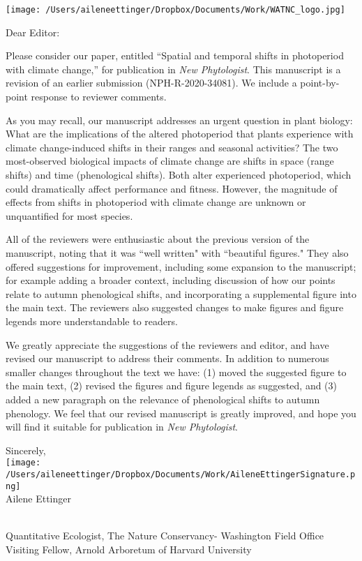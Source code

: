 \documentclass[11pt,a4paper]{letter}
\begin{document}
\begin{letter}{}
\texttt{[image: /Users/aileneettinger/Dropbox/Documents/Work/WATNC\_logo.jpg]}

\opening{Dear Editor:}
Please consider our paper, entitled ``Spatial and temporal shifts in photoperiod with climate change,'' for publication in  \emph{New Phytologist}. This manuscript is a revision of an earlier submission (NPH-R-2020-34081). We include a point-by-point response to reviewer comments.

\par As you may recall, our manuscript addresses an urgent question in plant biology: What are the implications
of the altered photoperiod that plants experience with climate change-induced shifts in their ranges and seasonal activities? The two most-observed biological impacts of climate change are shifts in space (range shifts) and time (phenological shifts). Both alter experienced photoperiod, which could dramatically affect performance and fitness. However, the magnitude of effects from shifts in photoperiod with climate change are unknown or unquantified for most species. 

\par All of the reviewers were enthusiastic about the previous version of the manuscript, noting that it was ``well written" with ``beautiful figures." They also offered suggestions for improvement, including some expansion to the manuscript; for example adding a broader context, including discussion of how our points relate to autumn phenological shifts, and incorporating a supplemental figure into the main text. The reviewers also suggested changes to make figures and figure legends more understandable to readers. 
\par We greatly appreciate the suggestions of the reviewers and editor, and have revised our manuscript to address their comments. In addition to numerous smaller changes throughout the text we have: (1) moved the suggested figure to the main text, (2) revised the figures and figure legends as suggested, and (3) added a new paragraph on the relevance of phenological shifts to autumn phenology. We feel that our revised manuscript is greatly improved, and hope you will find it suitable for publication in \emph{New Phytologist}.

\par Sincerely,\\

\texttt{[image: /Users/aileneettinger/Dropbox/Documents/Work/AileneEttingerSignature.png]} \\
Ailene Ettinger
\begin{footnotesize}\\
Quantitative Ecologist, The Nature Conservancy- Washington Field Office\\
Visiting Fellow, Arnold Arboretum of Harvard University 
\end{footnotesize}


\end{letter}
\end{document}

